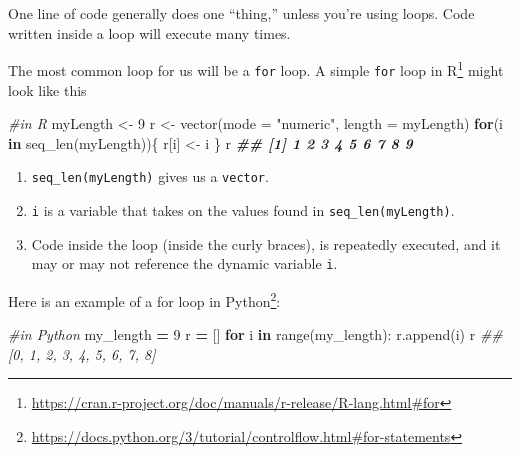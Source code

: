 \documentclass[
  12pt,
  krantz2]{krantz}
\makeatletter
\newenvironment{Shaded}{\begin{snugshade}}{\end{snugshade}}
\newcommand{\AttributeTok}[1]{\textcolor[rgb]{0.61,0.61,0.61}{#1}}
\newcommand{\BuiltInTok}[1]{#1}
\newcommand{\CommentTok}[1]{\textcolor[rgb]{0.37,0.37,0.37}{\textit{#1}}}
\newcommand{\ControlFlowTok}[1]{\textcolor[rgb]{0.27,0.27,0.27}{\textbf{#1}}}
\newcommand{\DecValTok}[1]{\textcolor[rgb]{0.06,0.06,0.06}{#1}}
\newcommand{\DocumentationTok}[1]{\textcolor[rgb]{0.37,0.37,0.37}{\textbf{\textit{#1}}}}
\newcommand{\FunctionTok}[1]{\textcolor[rgb]{0,0,0}{#1}}
\newcommand{\KeywordTok}[1]{\textcolor[rgb]{0.27,0.27,0.27}{\textbf{#1}}}
\newcommand{\NormalTok}[1]{#1}
\newcommand{\OperatorTok}[1]{\textcolor[rgb]{0.43,0.43,0.43}{\textbf{#1}}}
\newcommand{\OtherTok}[1]{\textcolor[rgb]{0.37,0.37,0.37}{#1}}
\newcommand{\StringTok}[1]{\textcolor[rgb]{0.5,0.5,0.5}{#1}}
\providecommand{\tightlist}{%
  \setlength{\itemsep}{0pt}\setlength{\parskip}{0pt}}
\renewcommand{\href}[2]{#2\footnote{\url{#1}}}
\newenvironment{kframe}{%
\medskip{}
\setlength{\fboxsep}{.8em}
 \def\at@end@of@kframe{}%
 \ifinner\ifhmode%
  \def\at@end@of@kframe{\end{minipage}}%
  \begin{minipage}{\columnwidth}%
 \fi\fi%
 \def\FrameCommand##1{\hskip\@totalleftmargin \hskip-\fboxsep
 \colorbox{shadecolor}{##1}\hskip-\fboxsep
     \hskip-\linewidth \hskip-\@totalleftmargin \hskip\columnwidth}%
 \MakeFramed {\advance\hsize-\width
   \@totalleftmargin\z@ \linewidth\hsize
   \@setminipage}}%
 {\par\unskip\endMakeFramed%
 \at@end@of@kframe}
\renewenvironment{Shaded}{\begin{kframe}}{\end{kframe}}
\makeatother
\begin{document}
One line of code generally does one ``thing,'' unless you're using loops. Code written inside a loop will execute many times.

The most common loop for us will be a \texttt{for} loop. A simple \href{https://cran.r-project.org/doc/manuals/r-release/R-lang.html\#for}{\texttt{for} loop in R} might look like this

\begin{Shaded}
\begin{Highlighting}[]
\CommentTok{\#in R}
\NormalTok{myLength }\OtherTok{\textless{}{-}} \DecValTok{9}
\NormalTok{r }\OtherTok{\textless{}{-}} \FunctionTok{vector}\NormalTok{(}\AttributeTok{mode =} \StringTok{"numeric"}\NormalTok{, }\AttributeTok{length =}\NormalTok{ myLength)}
\ControlFlowTok{for}\NormalTok{(i }\ControlFlowTok{in} \FunctionTok{seq\_len}\NormalTok{(myLength))\{}
\NormalTok{    r[i] }\OtherTok{\textless{}{-}}\NormalTok{ i}
\NormalTok{\}}
\NormalTok{r}
\DocumentationTok{\#\# [1] 1 2 3 4 5 6 7 8 9}
\end{Highlighting}
\end{Shaded}

\begin{enumerate}
\def\labelenumi{\arabic{enumi}.}
\tightlist
\item
  \texttt{seq\_len(myLength)} gives us a \texttt{vector}.
\item
  \texttt{i} is a variable that takes on the values found in \texttt{seq\_len(myLength)}.
\item
  Code inside the loop (inside the curly braces), is repeatedly executed, and it may or may not reference the dynamic variable \texttt{i}.
\end{enumerate}

\href{https://docs.python.org/3/tutorial/controlflow.html\#for-statements}{Here is an example of a for loop in Python}:

\begin{Shaded}
\begin{Highlighting}[]
\CommentTok{\#in Python}
\NormalTok{my\_length }\OperatorTok{=} \DecValTok{9}
\NormalTok{r }\OperatorTok{=}\NormalTok{ []}
\ControlFlowTok{for}\NormalTok{ i }\KeywordTok{in} \BuiltInTok{range}\NormalTok{(my\_length):}
\NormalTok{    r.append(i)}
\NormalTok{r}
\CommentTok{\#\# [0, 1, 2, 3, 4, 5, 6, 7, 8]}
\end{Highlighting}
\end{Shaded}
\end{document}
